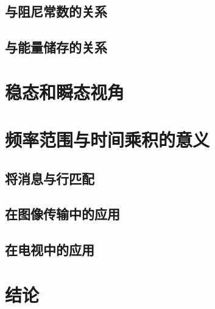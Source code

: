 \documentclass{hfutpaper}
\begin{document}
\subsection{与阻尼常数的关系}

\subsection{与能量储存的关系}

\section{稳态和瞬态视角}

\section{频率范围与时间乘积的意义}

\subsection{将消息与行匹配}

\subsection{在图像传输中的应用}

\subsection{在电视中的应用}

\section{结论}
\end{document}
